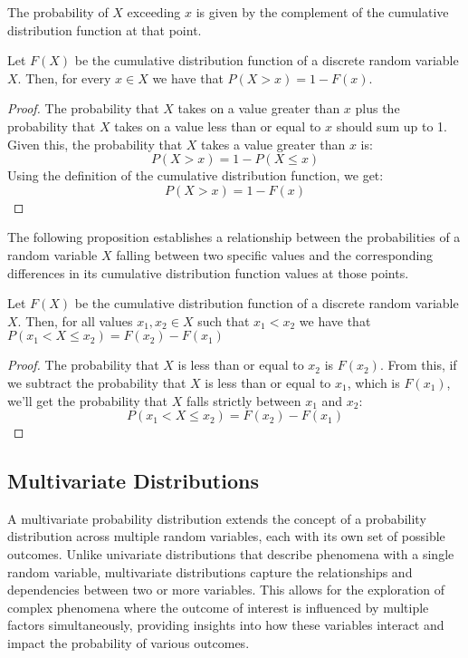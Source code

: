 The probability of $X$ exceeding $x$ is given by the complement of the cumulative distribution function at that point.

\begin{proposition}
Let $F(X)$ be the cumulative distribution function of a discrete random variable $X$. Then, for every $x \in X$ we have that $P\left(X>x\right)=1-F\left(x\right)$.
\end{proposition}
\begin{proof}
The probability that $X$ takes on a value greater than $x$ plus the probability that $X$ takes on a value less than or equal to $x$ should sum up to 1. Given this, the probability that $X$ takes a value greater than $x$ is:
\[
P(X > x) = 1 - P(X \leq x)
\]
Using the definition of the cumulative distribution function, we get:
\[
P(X > x) = 1 - F(x) 
\]
\end{proof}

The following proposition establishes a relationship between the probabilities of a random variable \( X \) falling between two specific values and the corresponding differences in its cumulative distribution function values at those points.

\begin{proposition}
Let $F(X)$ be the cumulative distribution function of a discrete random variable $X$. Then, for all values $x_1, x_2 \in X$ such that $x_1 < x_2$ we have that $P\left(x_1 < X \leq x_2 \right) = F\left(x_2\right) - F\left(x_1\right)$
\end{proposition}
 \begin{proof}
The probability that $X$ is less than or equal to $x_2$ is $F(x_2)$. From this, if we subtract the probability that $X$ is less than or equal to $x_1$, which is $F(x_1)$, we'll get the probability that $X$ falls strictly between $x_1$ and $x_2$:
\[
P(x_1 < X \leq x_2) = F(x_2) - F(x_1)
\]
\end{proof}


\subsection{Multivariate Distributions}

A multivariate probability distribution extends the concept of a probability distribution across multiple random variables, each with its own set of possible outcomes. Unlike univariate distributions that describe phenomena with a single random variable, multivariate distributions capture the relationships and dependencies between two or more variables. This allows for the exploration of complex phenomena where the outcome of interest is influenced by multiple factors simultaneously, providing insights into how these variables interact and impact the probability of various outcomes.

